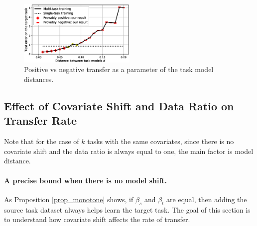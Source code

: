 \begin{figure}
	\centering
	\includegraphics[width=0.5\textwidth]{figures/model_shift_phase_transition.eps}
	\caption{Positive vs negative transfer as a parameter of the task model distances.}
	\label{fig_model_shift_phasetrans}
\end{figure}


\subsection{Effect of Covariate Shift and Data Ratio on Transfer Rate}


Note that for the case of $k$ tasks with the same covariates, since there is no covariate shift and the data ratio is always equal to one, the main factor is model distance.

\paragraph{A precise bound when there is no model shift.}
As Proposition \ref{prop_monotone} shows, if $\beta_s$ and $\beta_t$ are equal, then adding the source task dataset always helps learn the target task.
The goal of this section is to understand how covariate shift affects the rate of transfer. 


